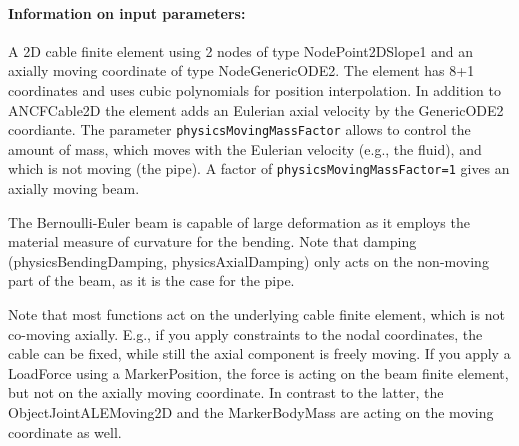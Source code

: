 \paragraph{Information on input parameters:} 
\finishTable
 \noindent
    A 2D cable finite element using 2 nodes of type NodePoint2DSlope1 and an axially moving coordinate of type NodeGenericODE2.
    The element has 8+1 coordinates and uses cubic polynomials for position interpolation.
    In addition to ANCFCable2D the element adds an Eulerian axial velocity by the GenericODE2 coordiante.
    The parameter \texttt{physicsMovingMassFactor} allows to control the amount of mass, which moves with
    the Eulerian velocity (e.g., the fluid), and which is not moving (the pipe). 
    A factor of \texttt{physicsMovingMassFactor=1} gives an axially moving beam.

    The Bernoulli-Euler beam is capable of large deformation as it employs the material measure of curvature for the bending.
    Note that damping (physicsBendingDamping, physicsAxialDamping) only acts on the non-moving part of the beam, as it is the case for the pipe.
    
    Note that most functions act on the underlying cable finite element, which is not co-moving axially. E.g., if you apply constraints
    to the nodal coordinates, the cable can be fixed, while still the axial component is freely moving.
    If you apply a LoadForce using a MarkerPosition, the force is acting on the beam finite element, but not on the axially moving coordinate.
    In contrast to the latter, the ObjectJointALEMoving2D and the MarkerBodyMass are acting on the moving coordinate as well.

